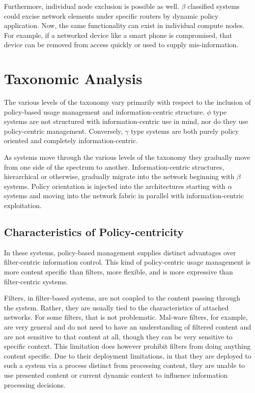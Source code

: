 Furthermore, individual node exclusion is possible as well. $\beta$ classified systems could excise network elements under specific routers by dynamic policy application.  Now, the same functionality can exist in individual compute nodes.  For example, if a networked device like a smart phone is compromised, that device can be removed from access quickly or used to supply mis-information.

\section{Taxonomic Analysis}
The various levels of the taxonomy vary primarily with respect to the inclusion of policy-based usage management and information-centric structure.  $\phi$ type systems are not structured with information-centric use in mind, nor do they use policy-centric management.  Conversely, $\gamma$ type systems are both purely policy oriented and completely information-centric.

As systems move through the various levels of the taxonomy they gradually move from one side of the spectrum to another.  Information-centric structures, hierarchical or otherwise, gradually migrate into the network beginning with $\beta$ systems.  Policy orientation is injected into the architectures starting with $\alpha$ systems and moving into the network fabric in parallel with information-centric exploitation.

\subsection{Characteristics of Policy-centricity}
In these systems, policy-based management supplies distinct advantages over filter-centric information control.  This kind of policy-centric usage management is more content specific than filters, more flexible, and is more expressive than filter-centric systems.

Filters, in filter-based systems, are not coupled to the content passing through the system.  Rather, they are usually tied to the characteristics of attached networks.  For some filters, that is not problematic.  Mal-ware filters, for example, are very general and do not need to have an understanding of filtered content and are not sensitive to that content at all, though they can be very sensitive to specific context.  This limitation does however prohibit filters from doing anything content specific.  Due to their deployment limitations, in that they are deployed to such a system via a process distinct from processing content, they are unable to use presented content or current dynamic context to influence information processing decisions.

